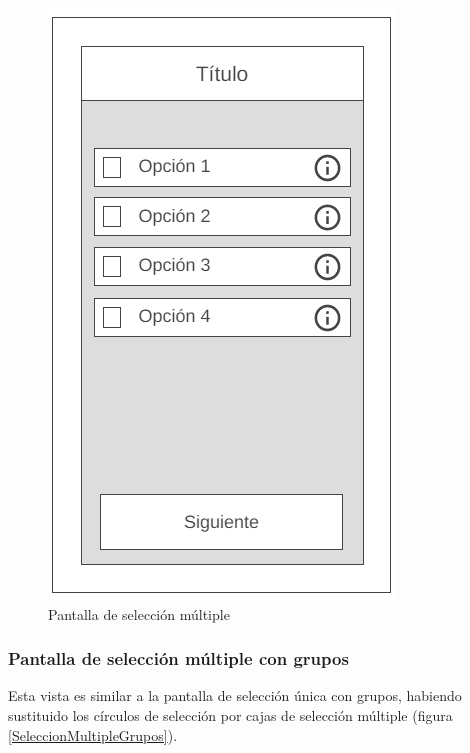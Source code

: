 \begin{figure}[H]
    \centering
    \includegraphics[scale=0.4]{Figures/Mockups/Mock_SeleccionMultiple.png}
    \caption{Pantalla de selección múltiple}
    \label{SeleccionMultiple}    
\end{figure}

\subsubsection{Pantalla de selección múltiple con grupos}
Esta vista es similar a la pantalla de selección única con grupos, habiendo sustituido los círculos de selección por 
cajas de selección múltiple (figura \ref*{SeleccionMultipleGrupos}).

